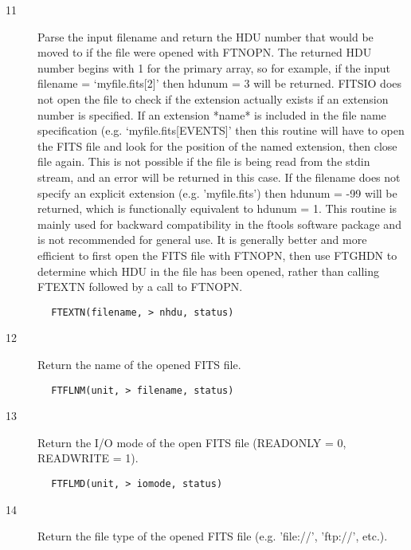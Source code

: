 \documentclass[11pt]{book}
\begin{document}
\begin{description}
\item[11]  Parse the input filename and return the HDU number that would be
moved to if the file were opened with FTNOPN.    The returned HDU
number begins with 1 for the primary array, so for example, if the
input filename = `myfile.fits[2]' then hdunum = 3 will be returned.
FITSIO does not open the file to check if the extension actually exists
if an extension number is specified. If an extension *name* is included
in the file name specification (e.g.  `myfile.fits[EVENTS]' then this
routine will have to open the FITS file and look for the position of
the named extension, then close file again.  This is not possible if
the file is being read from the stdin stream, and an error will be
returned in this case.  If the filename does not specify an explicit
extension (e.g. 'myfile.fits') then hdunum = -99 will be returned,
which is functionally equivalent to hdunum = 1. This routine is mainly
used for backward compatibility in the ftools software package and is
not recommended for general use.  It is generally better and more
efficient to first open the FITS file with FTNOPN, then use FTGHDN to
determine which HDU in the file has been opened, rather than calling
 FTEXTN followed by a call to FTNOPN.
\end{description}

\begin{verbatim}
        FTEXTN(filename, > nhdu, status)
\end{verbatim}

\begin{description}
\item[12] Return the name of the opened FITS file.
\end{description}

\begin{verbatim}
        FTFLNM(unit, > filename, status)
\end{verbatim}

\begin{description}
\item[13] Return the I/O mode of the open FITS file (READONLY = 0, READWRITE = 1).
\end{description}

\begin{verbatim}
        FTFLMD(unit, > iomode, status)
\end{verbatim}

\begin{description}
\item[14] Return the file type of the opened FITS file (e.g. 'file://', 'ftp://',
  etc.).
\end{description}
\end{document}
